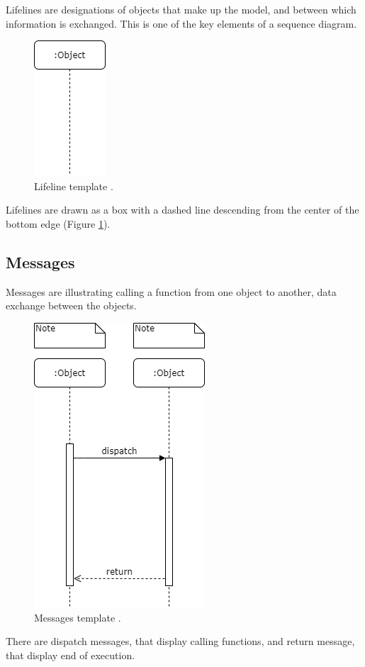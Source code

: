 \documentclass[10pt, twoside, slovak,a4paper]{article}
\begin{document}
Lifelines are designations of objects that make up the model, and between which information is exchanged. This is one of the key elements of a sequence diagram.
\begin{figure}[tbh]
	\centering
	\includegraphics[scale=0.4]{lifeline.png}
	\caption{Lifeline template \cite{Sequence_diagram:Lambert}.}
	\label{fig:lifeline}
\end{figure}

Lifelines are drawn as a box with a dashed line descending from the center of the bottom edge (Figure \ref{fig:lifeline})\cite{IBM_SD}.


\subsection{Messages} \label{notation:messages}
Messages are illustrating calling a function from one object to another, data exchange between the objects.
\begin{figure}[tbh]
	\centering
	\includegraphics[scale=0.4]{Message.png}
	\caption{Messages template \cite{Sequence_diagram:Lambert}.}
	\label{fig:messages}
\end{figure}
There are dispatch messages, that display calling functions, and return message, that display end of execution\cite{UML}.
\end{document}
